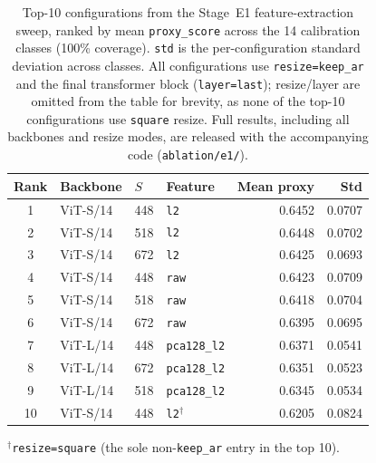 \begin{table}[t]
\centering
\caption{Top-10 configurations from the Stage~E1 feature-extraction sweep,
ranked by mean \texttt{proxy\_score} across the 14 calibration classes
(100\% coverage). \texttt{std} is the per-configuration standard
deviation across classes. All configurations use \texttt{resize=keep\_ar}
and the final transformer block (\texttt{layer=last}); resize/layer are
omitted from the table for brevity, as none of the top-10 configurations
use \texttt{square} resize. Full results, including all backbones and
resize modes, are released with the accompanying code
(\texttt{ablation/e1/}).}
\label{tab:e1-sweep-top10}
\begin{tabular}{@{}clllrr@{}}
\toprule
\textbf{Rank} & \textbf{Backbone} & \textbf{$S$} & \textbf{Feature} & \textbf{Mean proxy} & \textbf{Std} \\
\midrule
1  & ViT-S/14 & 448 & \texttt{l2}        & 0.6452 & 0.0707 \\
2  & ViT-S/14 & 518 & \texttt{l2}        & 0.6448 & 0.0702 \\
3  & ViT-S/14 & 672 & \texttt{l2}        & 0.6425 & 0.0693 \\
4  & ViT-S/14 & 448 & \texttt{raw}       & 0.6423 & 0.0709 \\
5  & ViT-S/14 & 518 & \texttt{raw}       & 0.6418 & 0.0704 \\
6  & ViT-S/14 & 672 & \texttt{raw}       & 0.6395 & 0.0695 \\
7  & ViT-L/14 & 448 & \texttt{pca128\_l2} & 0.6371 & 0.0541 \\
8  & ViT-L/14 & 672 & \texttt{pca128\_l2} & 0.6351 & 0.0523 \\
9  & ViT-L/14 & 518 & \texttt{pca128\_l2} & 0.6345 & 0.0534 \\
10 & ViT-S/14 & 448 & \texttt{l2}$^\dagger$ & 0.6205 & 0.0824 \\
\bottomrule
\end{tabular}
 
\vspace{2pt}
{\footnotesize $^\dagger$\texttt{resize=square} (the sole non-\texttt{keep\_ar} entry in the top 10).}
\end{table}
 

